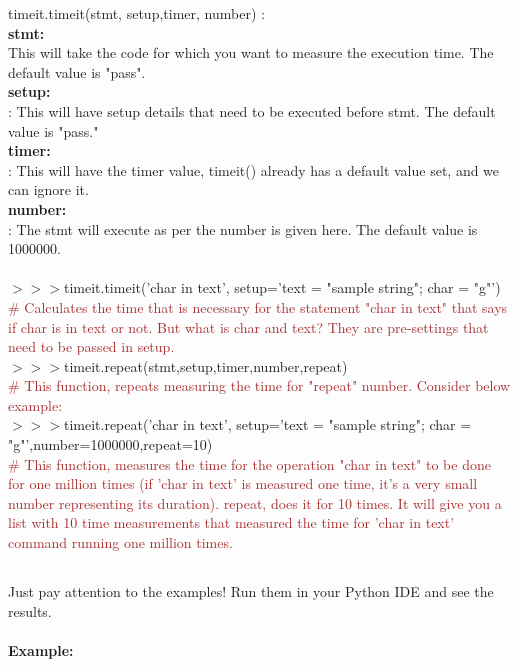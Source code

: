 \documentclass[a4paper,18pt]{article}
\begin{document}
timeit.timeit(stmt, setup,timer, number) : \\
\textbf{stmt:\\} This will take the code for which you want to measure the execution time. The default value is "pass".\\
\textbf{setup:\\}: This will have setup details that need to be executed before stmt. The default value is "pass."\\
\textbf{timer:\\}: This will have the timer value, timeit() already has a default value set, and we can ignore it.\\
\textbf{number:\\}: The stmt will execute as per the number is given here. The default value is 1000000.\\\\


$>>>$timeit.timeit('char in text', setup='text = "sample string"; char = "g"')\\{\textcolor{brown}{\# Calculates the time that is necessary for the statement "char in text" that says if char is in text or not. But what is char and text? They are pre-settings that need to be passed in setup.}}\\

$>>>$timeit.repeat(stmt,setup,timer,number,repeat)\\{\textcolor{brown}{\# This function, repeats measuring the time for "repeat" number. Consider below example:}}\\

$>>>$timeit.repeat('char in text', setup='text = "sample string"; char = "g"',number=1000000,repeat=10)\\{\textcolor{brown}{\# This function, measures the time for the operation "char in text" to be done for one million times (if 'char in text' is measured one time, it's a very small number representing its duration). repeat, does it for 10 times. It will give you a list with 10 time measurements that measured the time for 'char in text' command running one million times.}}\\



\subsection{\colorbox {matgreen}{\color{white}{\large .join functionality}}}
Just pay attention to the examples! Run them in your Python IDE and see the results.\\\\
\textbf{Example:\\}
\end{document}
